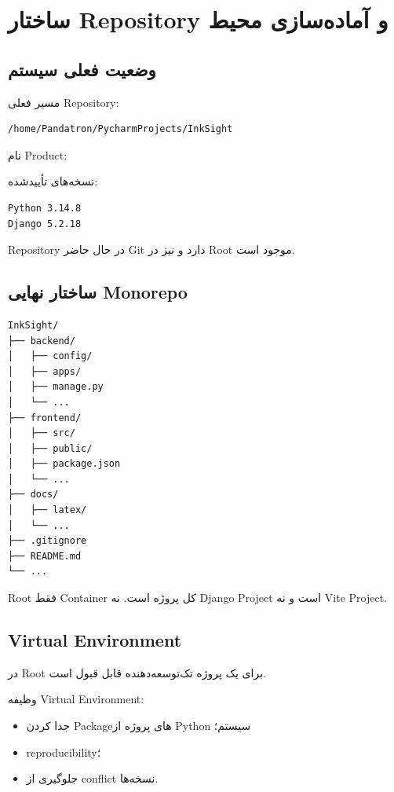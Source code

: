 
\chapter{ساختار Repository و آماده‌سازی محیط}

\section{وضعیت فعلی سیستم}

مسیر فعلی Repository:
\begin{latin}
\begin{lstlisting}
/home/Pandatron/PycharmProjects/InkSight
\end{lstlisting}
\end{latin}

نام Product:
\begin{center}
\textbf{}
\end{center}

نسخه‌های تأییدشده:
\begin{latin}
\begin{lstlisting}
Python 3.14.8
Django 5.2.18
\end{lstlisting}
\end{latin}

Repository در حال حاضر Git دارد و  نیز در Root موجود است.

\section{ساختار نهایی Monorepo}

\begin{latin}
\begin{lstlisting}
InkSight/
├── backend/
│   ├── config/
│   ├── apps/
│   ├── manage.py
│   └── ...
├── frontend/
│   ├── src/
│   ├── public/
│   ├── package.json
│   └── ...
├── docs/
│   ├── latex/
│   └── ...
├── .gitignore
├── README.md
└── ...
\end{lstlisting}
\end{latin}

Root فقط Container کل پروژه است. نه Django Project است و نه Vite Project.

\section{Virtual Environment}

 در Root برای یک پروژه تک‌توسعه‌دهنده قابل قبول است.

وظیفه Virtual Environment:
\begin{itemize}
  \item جدا کردن Packageهای پروژه از Python سیستم؛
  \item reproducibility؛
  \item جلوگیری از conflict نسخه‌ها.
\end{itemize}

